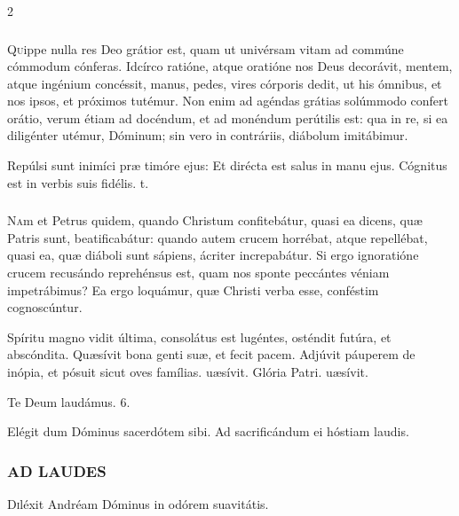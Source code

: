 \documentclass[9pt,twoside]{extarticle}
\begin{document}
\begin{multicols}{2}
\subsubsection*{\center {}}
\lettrine{Q}uippe nulla res Deo grátior est, quam ut univérsam vitam ad commúne cómmodum cónferas. Idcírco ratióne, atque oratióne nos Deus decorávit, mentem, atque ingénium concéssit, manus, pedes, vires córporis dedit, ut his ómnibus, et nos ipsos, et próximos tutémur. Non enim ad agéndas grátias solúmmodo confert orátio, verum étiam ad docéndum, et ad monéndum perútilis est: qua in re, si ea diligénter utémur, Dóminum; sin vero in contráriis, diábolum imitábimur.

\begin{tightlist}{}
\item {} Repúlsi sunt inimíci præ timóre ejus: \textred{*} Et dirécta est salus in manu ejus.  Cógnitus est in verbis suis fidélis. t.
\end{tightlist}

\subsubsection*{\center {}}
\lettrine{N}am et Petrus quidem, quando Christum confitebátur, quasi ea dicens, quæ Patris sunt, beatificabátur: quando autem crucem horrébat, atque repellébat, quasi ea, quæ diáboli sunt sápiens, ácriter increpabátur. Si ergo ignoratióne crucem recusándo reprehénsus est, quam nos sponte peccántes véniam impetrábimus? Ea ergo loquámur, quæ Christi verba esse, conféstim cognoscúntur.

\begin{tightlist}{}
\item {} Spíritu magno vidit última, consolátus est lugéntes, osténdit futúra, et abscóndita. \textred{*} Quæsívit bona genti suæ, et fecit pacem.  Adjúvit páuperem de inópia, et pósuit sicut oves famílias. uæsívit. Glória Patri. uæsívit.
\item Te Deum laudámus. 6.
\item {} Elégit dum Dóminus sacerdótem sibi.  Ad sacrificándum ei hóstiam laudis.
\end{tightlist}

\subsubsection*{\center \textsc{AD LAUDES}}
\begin{center} \end{center}
\lettrine{D}iléxit Andréam Dóminus in odórem suavitátis.


\end{multicols}
\end{document}
